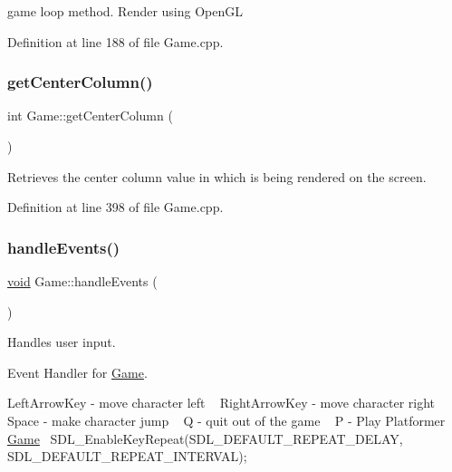 game loop method. Render using Open\+GL 

Definition at line 188 of file Game.\+cpp.

\mbox{\label{class_game_a8329ab00bbf109137c04a2e9b3d4d483}} 
\subsubsection{\texorpdfstring{getCenterColumn()}{getCenterColumn()}}
{\footnotesize\ttfamily int Game\+::get\+Center\+Column (\begin{DoxyParamCaption}{ }\end{DoxyParamCaption})}



Retrieves the center column value in which is being rendered on the screen. 



Definition at line 398 of file Game.\+cpp.

\mbox{\label{class_game_adb5563f62c0c82e3e42ec36501aa5698}} 
\subsubsection{\texorpdfstring{handleEvents()}{handleEvents()}}
{\footnotesize\ttfamily \mbox{\hyperlink{_s_d_l__opengles2__gl2ext_8h_ae5d8fa23ad07c48bb609509eae494c95}{void}} Game\+::handle\+Events (\begin{DoxyParamCaption}{ }\end{DoxyParamCaption})}



Handles user input. 

Event Handler for \mbox{\hyperlink{class_game}{Game}}.

Left\+Arrow\+Key -\/ move character left ~\newline
Right\+Arrow\+Key -\/ move character right ~\newline
Space -\/ make character jump ~\newline
Q -\/ quit out of the game ~\newline
P -\/ Play Platformer \mbox{\hyperlink{class_game}{Game}}~\newline
S\+D\+L\+\_\+\+Enable\+Key\+Repeat(\+S\+D\+L\+\_\+\+D\+E\+F\+A\+U\+L\+T\+\_\+\+R\+E\+P\+E\+A\+T\+\_\+\+D\+E\+L\+A\+Y, S\+D\+L\+\_\+\+D\+E\+F\+A\+U\+L\+T\+\_\+\+R\+E\+P\+E\+A\+T\+\_\+\+I\+N\+T\+E\+R\+V\+A\+L); 

